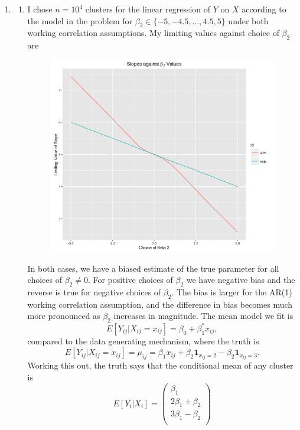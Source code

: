 \documentclass[11pt]{article}
\begin{document}
\begin{enumerate}
	\item
		\begin{enumerate}
			\item I chose $n=10^4$ clusters for the linear regression of $Y$ on $X$ according to the model in the problem for $\beta_2\in \{-5,-4.5,\dotsc,4.5,5\}$ under both working correlation assumptions. My limiting values against choice of $\beta_2$ are
				\begin{figure}[H]
				\centering
				\includegraphics[scale=0.4]{Rplotp41}
				\end{figure}
		In both cases, we have a biased estimate of the true parameter for all choices of $\beta_2\neq 0$. For positive choices of $\beta_2$ we have negative bias and the reverse is true for negative choices of $\beta_2$. The bias is larger for the AR(1) working correlation assumption, and the difference in bias becomes much more pronounced as $\beta_2$ increases in magnitude. The mean model we fit is
		\[
			E[Y_{ij} | X_{ij}=x_{ij}] = \beta_0 + \beta_1^*x_{ij},
		\]
		compared to the data generating mechanism, where the truth is
		\[
			E[Y_{ij}| X_{ij}=x_{ij}] = \mu_{ij} = \beta_1x_{ij} + \beta_2\bm{1}_{x_{ij}=2} - \beta_2 \bm{1}_{x_{ij}=3}.
		\]
		Working this out, the truth says that the conditional mean of any cluster is
		\[
			E[Y_i | X_i] = \begin{pmatrix}
				\beta_1 \\
				2\beta_1 + \beta_2 \\
				3\beta_1 - \beta_2 \\

\end{pmatrix}\]
\end{enumerate}
\end{enumerate}
\end{document}
